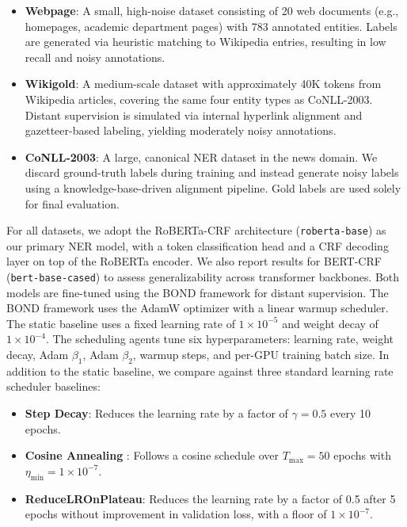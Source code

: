 \documentclass[11pt]{article}
\begin{document}
\begin{itemize}
    \item \textbf{Webpage}: A small, high-noise dataset consisting of 20 web documents (e.g., homepages, academic department pages) with 783 annotated entities. Labels are generated via heuristic matching to Wikipedia entries, resulting in low recall and noisy annotations.
    
    \item \textbf{Wikigold}: A medium-scale dataset with approximately 40K tokens from Wikipedia articles, covering the same four entity types as CoNLL-2003. Distant supervision is simulated via internal hyperlink alignment and gazetteer-based labeling, yielding moderately noisy annotations.
    
    \item \textbf{CoNLL-2003}: A large, canonical NER dataset in the news domain. We discard ground-truth labels during training and instead generate noisy labels using a knowledge-base-driven alignment pipeline. Gold labels are used solely for final evaluation.
\end{itemize}

For all datasets, we adopt the RoBERTa-CRF architecture (\texttt{roberta-base}) as our primary NER model, with a token classification head and a CRF decoding layer on top of the RoBERTa encoder. We also report results for BERT-CRF (\texttt{bert-base-cased}) to assess generalizability across transformer backbones. Both models are fine-tuned using the BOND framework \cite{liang2020bond} for distant supervision. The BOND framework uses the AdamW optimizer with a linear warmup scheduler. The static baseline uses a fixed learning rate of $1 \times 10^{-5}$ and weight decay of $1 \times 10^{-4}$. The scheduling agents tune six hyperparameters: learning rate, weight decay, Adam $\beta_1$, Adam $\beta_2$, warmup steps, and per-GPU training batch size. In addition to the static baseline, we compare against three standard learning rate scheduler baselines:
\begin{itemize}
    \item \textbf{Step Decay}: Reduces the learning rate by a factor of $\gamma=0.5$ every 10 epochs.
    \item \textbf{Cosine Annealing} \cite{loshchilov2017sgdr}: Follows a cosine schedule over $T_{\max}=50$ epochs with $\eta_{\min}=1 \times 10^{-7}$.
    \item \textbf{ReduceLROnPlateau}: Reduces the learning rate by a factor of 0.5 after 5 epochs without improvement in validation loss, with a floor of $1 \times 10^{-7}$.
\end{itemize}
\end{document}
